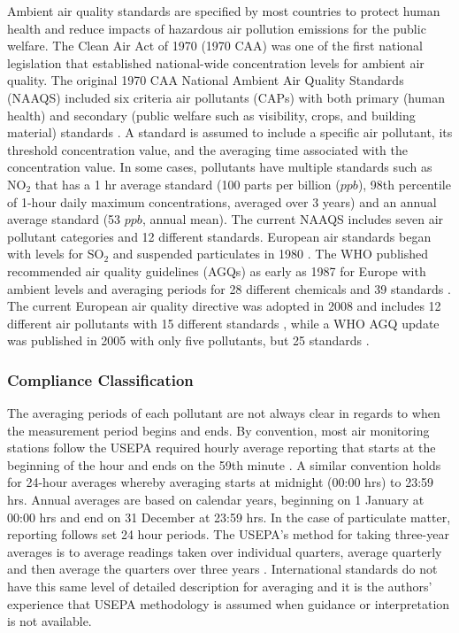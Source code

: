 Ambient air quality standards are specified by most countries to protect human health and reduce impacts of hazardous air pollution emissions for the public welfare. The Clean Air Act of 1970 (1970 CAA) was one of the first national legislation that established national-wide concentration levels for ambient air quality.  The original 1970 CAA National Ambient Air Quality Standards (NAAQS) included six criteria air pollutants (CAPs) with both primary (human health) and secondary (public welfare such as visibility, crops, and building material) standards \citep{USEPA1970}. A standard is assumed to include a specific air pollutant, its threshold concentration value, and the averaging time associated with the concentration value. In some cases, pollutants have multiple standards such as NO$_{2}$ that has a 1 hr average standard (100 parts per billion ($ppb$), 98th percentile of 1-hour daily maximum concentrations, averaged over 3 years) and an annual average standard (53 $ppb $, annual mean). The current NAAQS includes seven air pollutant categories and 12 different standards. European air standards began with levels for SO$_{2}$ and suspended particulates in 1980 \citep{EEC1980}. The WHO published recommended air quality guidelines (AGQs) as early as 1987 for Europe with ambient levels and averaging periods for 28 different chemicals and 39 standards \citep{Lubkert1994}. The current European air quality directive was adopted in 2008 and includes 12 different air pollutants with 15 different standards \citep{EU2008}, while a WHO AGQ update was published in 2005 with only five pollutants, but 25 standards \citep{WHO2006}. 

\subsubsection{Compliance Classification}

The averaging periods of each pollutant are not always clear in regards to when the measurement period begins and ends.  By convention, most air monitoring stations follow the USEPA required hourly average reporting that starts at the beginning of the hour and ends on the 59th minute \citep{CAA2007}.  A similar convention holds for 24-hour averages whereby averaging starts at midnight (00:00 hrs) to 23:59 hrs. Annual averages are based on calendar years, beginning on 1 January at 00:00 hrs and end on 31 December at 23:59 hrs.  In the case of particulate matter, reporting follows set 24 hour periods.  The USEPA’s method for taking three-year averages is to average readings taken over individual quarters, average quarterly and then average the quarters over three years \citep{Cohen1999}. International standards do not have this same level of detailed description for averaging and it is the authors’ experience that USEPA methodology is assumed when guidance or interpretation is not available.

